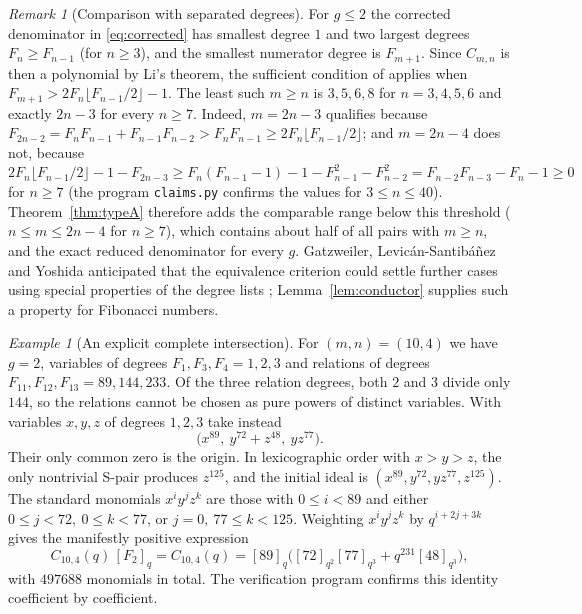 \documentclass[11pt,a4paper]{article}
\theoremstyle{definition}\newtheorem{definition}[theorem]{Definition}
\theoremstyle{remark}\newtheorem{remark}[theorem]{Remark}\newtheorem{example}[theorem]{Example}
\numberwithin{equation}{section}
\begin{document}
\begin{remark}[Comparison with separated degrees]\label{rem:gly}
For $g\le2$ the corrected denominator in \eqref{eq:corrected} has smallest degree $1$ and two largest degrees $F_n\ge F_{n-1}$ (for $n\ge3$), and the smallest numerator degree is $F_{m+1}$. Since $C_{m,n}$ is then a polynomial by Li's theorem, the sufficient condition of \cite[Thm.~3.9]{gly} applies when $F_{m+1}>2F_n\lfloor F_{n-1}/2\rfloor-1$. The least such $m\ge n$ is $3,5,6,8$ for $n=3,4,5,6$ and exactly $2n-3$ for every $n\ge7$. Indeed, $m=2n-3$ qualifies because $F_{2n-2}=F_nF_{n-1}+F_{n-1}F_{n-2}>F_nF_{n-1}\ge2F_n\lfloor F_{n-1}/2\rfloor$; and $m=2n-4$ does not, because $2F_n\lfloor F_{n-1}/2\rfloor-1-F_{2n-3}\ge F_n(F_{n-1}-1)-1-F_{n-1}^2-F_{n-2}^2=F_{n-2}F_{n-3}-F_n-1\ge0$ for $n\ge7$ (the program \texttt{claims.py} confirms the values for $3\le n\le40$). Theorem~\ref{thm:typeA} therefore adds the comparable range below this threshold ($n\le m\le 2n-4$ for $n\ge7$), which contains about half of all pairs with $m\ge n$, and the exact reduced denominator for every $g$. Gatzweiler, Levic\'an-Santib\'a\~nez and Yoshida anticipated that the equivalence criterion could settle further cases using special properties of the degree lists \cite[Remark~3.12]{gly}; Lemma~\ref{lem:conductor} supplies such a property for Fibonacci numbers.
\end{remark}

\begin{example}[An explicit complete intersection]\label{ex:104}
For $(m,n)=(10,4)$ we have $g=2$, variables of degrees $F_1,F_3,F_4=1,2,3$ and relations of degrees $F_{11},F_{12},F_{13}=89,144,233$. Of the three relation degrees, both $2$ and $3$ divide only $144$, so the relations cannot be chosen as pure powers of distinct variables. With variables $x,y,z$ of degrees $1,2,3$ take instead
\[
 \big(x^{89},\ y^{72}+z^{48},\ yz^{77}\big).
\]
Their only common zero is the origin. In lexicographic order with $x>y>z$, the only nontrivial S-pair produces $z^{125}$, and the initial ideal is $(x^{89},y^{72},yz^{77},z^{125})$. The standard monomials $x^iy^jz^k$ are those with $0\le i<89$ and either $0\le j<72,\ 0\le k<77$, or $j=0,\ 77\le k<125$. Weighting $x^iy^jz^k$ by $q^{i+2j+3k}$ gives the manifestly positive expression
\[
 C_{10,4}(q)\,[F_2]_q=C_{10,4}(q)=[89]_q\Big([72]_{q^2}[77]_{q^3}+q^{231}[48]_{q^3}\Big),
\]
with $497688$ monomials in total. The verification program confirms this identity coefficient by coefficient.
\end{example}
\end{document}
